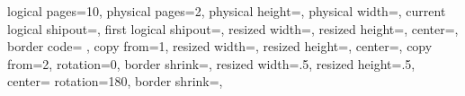 \usepackage{pgfmorepages}

{%
  \edef\pgfpageoptionheight{\the\paperheight}
  \edef\pgfpageoptionwidth{\the\paperwidth}
  \edef\pgfpageoptionborder{0pt}
  \edef\pgfpageoptionfirstshipout{3}
}%
{%
  \pgfpagesphysicalpageoptions%
  {%
    logical pages=10,%
    physical pages=2,%
    physical height=\pgfpageoptionheight,%
    physical width=\pgfpageoptionwidth,%
    current logical shipout=\pgfpageoptionfirstshipout,%
    first logical shipout=\pgfpageoptionfirstshipout,%
  }
  {%
    resized width=\pgfphysicalwidth,%
    resized height=\pgfphysicalheight,%
    center=\pgfpoint{.5\pgfphysicalwidth}{.5\pgfphysicalheight},%
    border code={%
        \color{gray!50}\pgfsetlinewidth{0.25pt}%
        \pgfsetdash{{10pt}{5pt}}{0pt}%
        \color{black}%
        \pgfsetdash{}{0pt}%
      },%
    copy from=1,%
  }%
  {%
    resized width=\pgfphysicalwidth,%
    resized height=\pgfphysicalheight,%
    center=\pgfpoint{.5\pgfphysicalwidth}{.5\pgfphysicalheight},%
    copy from=2,%
  }%
  {%
    rotation=0,%
    border shrink=\pgfpageoptionborder,%
    resized width=.5\pgfphysicalwidth,%
    resized height=.5\pgfphysicalheight,%
    center=\pgfpoint{.25\pgfphysicalwidth}{.75\pgfphysicalheight}%
  }%
  {%
    rotation=180,%
    border shrink=\pgfpageoptionborder,%
}}
